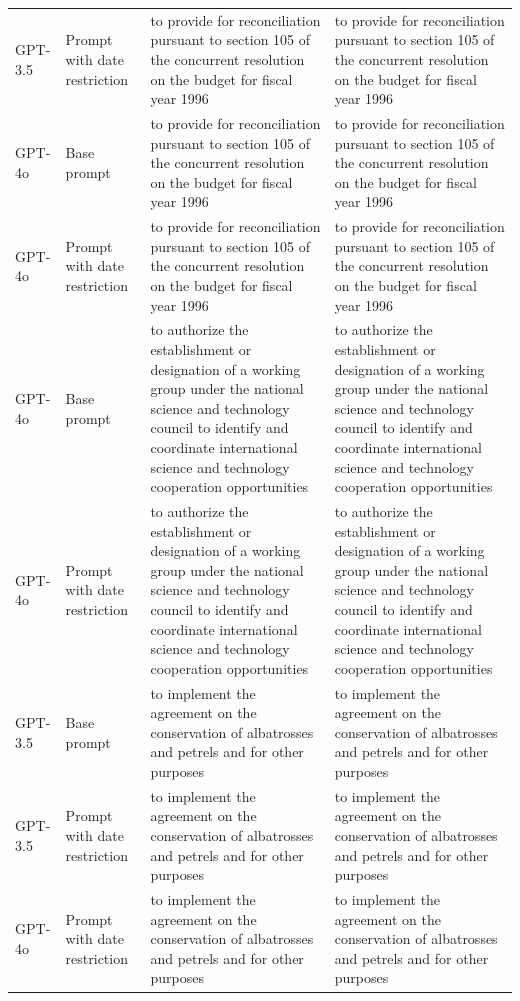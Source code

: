 \begin{longtable}{>{\raggedright\arraybackslash}p{1.4cm}>{\raggedright\arraybackslash}p{1.4cm}>{\raggedright\arraybackslash}p{5.5cm}>{\raggedright\arraybackslash}p{5.5cm}}
GPT-3.5 & Prompt with date restriction & to provide for reconciliation pursuant to section 105 of the concurrent resolution on the budget for fiscal year 1996 & to provide for reconciliation pursuant to section 105 of the concurrent resolution on the budget for fiscal year 1996\\
GPT-4o & Base prompt & to provide for reconciliation pursuant to section 105 of the concurrent resolution on the budget for fiscal year 1996 & to provide for reconciliation pursuant to section 105 of the concurrent resolution on the budget for fiscal year 1996\\
GPT-4o & Prompt with date restriction & to provide for reconciliation pursuant to section 105 of the concurrent resolution on the budget for fiscal year 1996 & to provide for reconciliation pursuant to section 105 of the concurrent resolution on the budget for fiscal year 1996\\
GPT-4o & Base prompt & to authorize the establishment or designation of a working group under the national science and technology council to identify and coordinate international science and technology cooperation opportunities & to authorize the establishment or designation of a working group under the national science and technology council to identify and coordinate international science and technology cooperation opportunities\\
GPT-4o & Prompt with date restriction & to authorize the establishment or designation of a working group under the national science and technology council to identify and coordinate international science and technology cooperation opportunities & to authorize the establishment or designation of a working group under the national science and technology council to identify and coordinate international science and technology cooperation opportunities\\
GPT-3.5 & Base prompt & to implement the agreement on the conservation of albatrosses and petrels and for other purposes & to implement the agreement on the conservation of albatrosses and petrels and for other purposes\\
GPT-3.5 & Prompt with date restriction & to implement the agreement on the conservation of albatrosses and petrels and for other purposes & to implement the agreement on the conservation of albatrosses and petrels and for other purposes\\
GPT-4o & Prompt with date restriction & to implement the agreement on the conservation of albatrosses and petrels and for other purposes & to implement the agreement on the conservation of albatrosses and petrels and for other purposes\\

\end{longtable}
